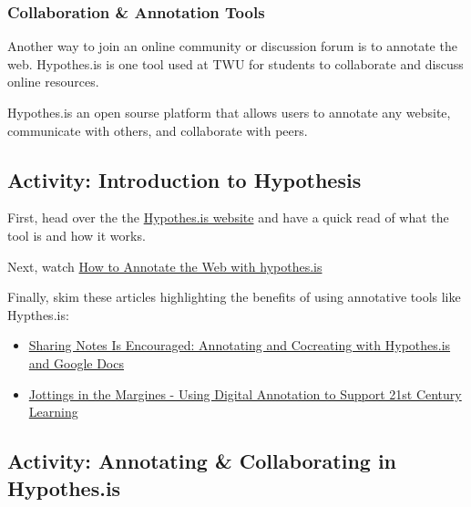 \documentclass[
]{book}
\theoremstyle{definition}
\theoremstyle{definition}
\theoremstyle{definition}
\theoremstyle{definition}
\theoremstyle{remark}
\begin{document}
\hypertarget{collaboration-annotation-tools}{%
\subsubsection*{Collaboration \& Annotation Tools}\label{collaboration-annotation-tools}}

Another way to join an online community or discussion forum is to annotate the web. Hypothes.is is one tool used at TWU for students to collaborate and discuss online resources.

Hypothes.is an open sourse platform that allows users to annotate any website, communicate with others, and collaborate with peers.

\hypertarget{activity-introduction-to-hypothesis}{%
\subsection*{Activity: Introduction to Hypothesis}\label{activity-introduction-to-hypothesis}}

\begin{reflect}
First, head over the the \href{https://web.hypothes.is/}{Hypothes.is website} and have a quick read of what the tool is and how it works.

Next, watch \href{https://www.youtube.com/watch?v=e235JwmmEcQ}{How to Annotate the Web with hypothes.is}

Finally, skim these articles highlighting the benefits of using annotative tools like Hypthes.is:

\begin{itemize}
\item
  \href{https://twu.idm.oclc.org/login?url=https://search.ebscohost.com/login.aspx?direct=true\&db=edsdoj\&AN=edsdoj.12d6cddd34714c51bc1f6f8d6d9dea39\&site=eds-live\&scope=site}{Sharing Notes Is Encouraged: Annotating and Cocreating with Hypothes.is and Google Docs}
\item
  \href{https://www.thescopes.org/assets/scopes/SCOPE_104-Wood_LT9.pdf}{Jottings in the Margines - Using Digital Annotation to Support 21st Century Learning}
\end{itemize}
\end{reflect}

\hypertarget{activity-annotating-collaborating-in-hypothes.is}{%
\subsection*{Activity: Annotating \& Collaborating in Hypothes.is}\label{activity-annotating-collaborating-in-hypothes.is}}
\end{document}
